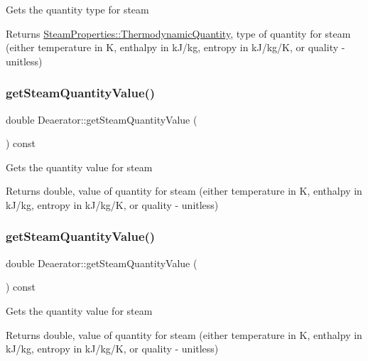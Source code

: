 Gets the quantity type for steam \begin{DoxyReturn}{Returns}
\hyperlink{class_steam_properties_ae0294bedf7d178c2d8fb6aed0f62fbff}{Steam\+Properties\+::\+Thermodynamic\+Quantity}, type of quantity for steam (either temperature in K, enthalpy in k\+J/kg, entropy in k\+J/kg/K, or quality -\/ unitless) 
\end{DoxyReturn}
\mbox{\label{class_deaerator_a5473feedca64e7c44143d422ed3e2401}} 
\subsubsection{\texorpdfstring{get\+Steam\+Quantity\+Value()}{getSteamQuantityValue()}\hspace{0.1cm}{\footnotesize\ttfamily [1/3]}}
{\footnotesize\ttfamily double Deaerator\+::get\+Steam\+Quantity\+Value (\begin{DoxyParamCaption}{ }\end{DoxyParamCaption}) const}

Gets the quantity value for steam \begin{DoxyReturn}{Returns}
double, value of quantity for steam (either temperature in K, enthalpy in k\+J/kg, entropy in k\+J/kg/K, or quality -\/ unitless) 
\end{DoxyReturn}
\mbox{\label{class_deaerator_a5473feedca64e7c44143d422ed3e2401}} 
\subsubsection{\texorpdfstring{get\+Steam\+Quantity\+Value()}{getSteamQuantityValue()}\hspace{0.1cm}{\footnotesize\ttfamily [2/3]}}
{\footnotesize\ttfamily double Deaerator\+::get\+Steam\+Quantity\+Value (\begin{DoxyParamCaption}{ }\end{DoxyParamCaption}) const}

Gets the quantity value for steam \begin{DoxyReturn}{Returns}
double, value of quantity for steam (either temperature in K, enthalpy in k\+J/kg, entropy in k\+J/kg/K, or quality -\/ unitless) 
\end{DoxyReturn}


